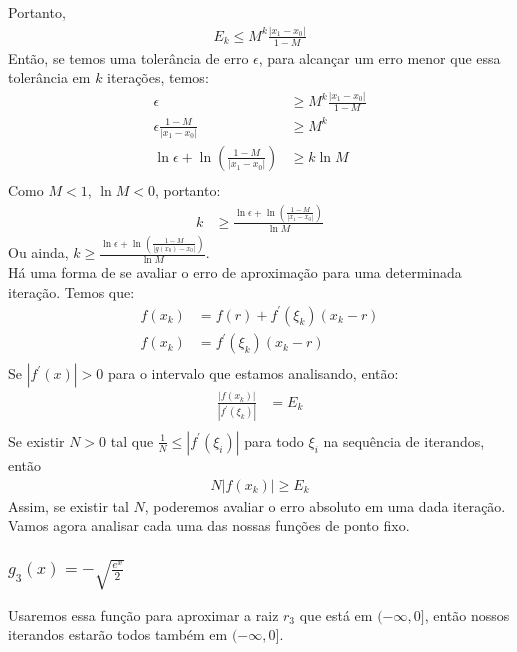 \documentclass{article}
\begin{document}
    Portanto, 
    \begin{align*}
        E_k \leq M^k \frac{|x_1 - x_0|}{1 - M}
    \end{align*}
    Então, se temos uma tolerância de erro $\epsilon$, para alcançar um erro menor que essa tolerância em $k$ iterações, temos:
    \begin{align*}
        \epsilon &\geq M^k \frac{|x_1 - x_0|}{1 - M}\\
        \epsilon \frac{1 - M}{|x_1 - x_0|} &\geq M^k\\
        \ln \epsilon + \ln \left( \frac{1 - M}{|x_1 - x_0|} \right) &\geq k \ln M\\
    \end{align*}
    Como $M < 1$, $\ln M < 0$, portanto:
    \begin{align*}
        k &\geq \frac{\ln \epsilon + \ln \left( \frac{1 - M}{|x_1 - x_0|} \right)}{\ln M}
    \end{align*}
    Ou ainda, $k \geq \frac{\ln \epsilon + \ln \left( \frac{1 - M}{|g(x_0) - x_0|} \right)}{\ln M}$.\\

    Há uma forma de se avaliar o erro de aproximação para uma determinada iteração. Temos que:
    \begin{align*}
        f(x_k) &= f(r) + f^{\prime}(\xi_k)(x_k - r)\\
        f(x_k) &= f^{\prime}(\xi_k)(x_k - r)\\
    \end{align*}
    Se $|f^\prime(x)| > 0$ para o intervalo que estamos analisando, então:
    \begin{align*}
        \frac{|f(x_k)|}{|f^{\prime}(\xi_k)|} &= E_k\\
    \end{align*}
    Se existir $N > 0$ tal que $\frac{1}{N} \leq |f^\prime(\xi_i)|$ para todo $\xi_i$ na sequência de iterandos, então
    \begin{align*}
        N |f(x_k)| \geq E_k
    \end{align*}
    Assim, se existir tal $N$, poderemos avaliar o erro absoluto em uma dada iteração.\\
    
    Vamos agora analisar cada uma das nossas funções de ponto fixo.
    \subsubsection{$g_3(x) = -\sqrt{\frac{e^x}{2}}$}
    Usaremos essa função para aproximar a raiz $r_3$ que está em $(-\infty, 0]$, então nossos iterandos estarão todos também em $(-\infty, 0]$.\\
    
\end{document}
